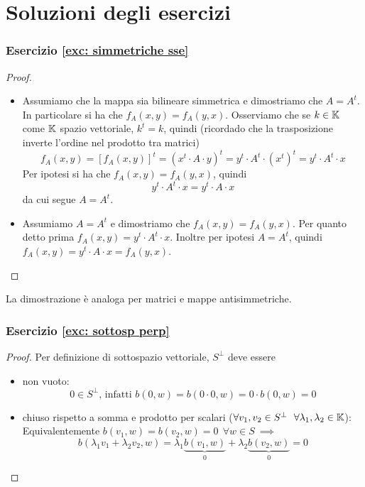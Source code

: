 \documentclass{article}     %
\begin{document}
\newpage
\section{Soluzioni degli esercizi}
\subsubsection*{Esercizio \ref{exc: simmetriche sse}}\label{sol: simmetriche sse}
\begin{proof}~
    \begin{itemize}
        \item [\say{$\Rarr$}] Assumiamo che la mappa sia bilineare simmetrica e dimostriamo che $A=A^t$. In particolare si ha che $f_A(x,y)=f_A(y,x)$. Osserviamo che se $k \in \mathbb{K}$ come $\mathbb{K}$ spazio vettoriale, $k^t=k$, quindi (ricordado che la trasposizione inverte l'ordine nel prodotto tra matrici)
        \[f_A(x,y)=[f_A(x,y)]^t=\left( x^t\cdot A \cdot y \right)^t= y^t\cdot  A^t \cdot \left( x^t \right)^t= y^t\cdot A^t \cdot x \] 
        Per ipotesi si ha che $f_A(x,y)=f_A(y,x)$, quindi 
        \[y^t\cdot A^t \cdot x= y^t\cdot A \cdot x\]
        da cui segue $A=A^t$.
        \item [\say{$\Larr$}] Assumiamo $A=A^t$ e dimostriamo che $f_A(x,y)=f_A(y,x)$. Per quanto detto prima $f_A(x,y)=y^t\cdot A^t\cdot x$. Inoltre per ipotesi $A=A^t$, quindi $f_A(x,y)=y^t\cdot A\cdot x=f_A(y,x)$.
    \end{itemize}
\end{proof}
La dimostrazione è analoga per matrici e mappe antisimmetriche.

\subsubsection*{Esercizio \ref{exc: sottosp perp}}\label{sol: sottosp perp}
\begin{proof}Per definizione di sottospazio vettoriale, $S^\perp$ deve essere
    \begin{itemize}
        \item non vuoto:
        \[0\in S^\perp\text{, infatti }b(0,w)=b(0\cdot 0,w)=0\cdot b(0,w)=0\]
        \item chiuso rispetto a somma e prodotto per scalari ($\forall v_1,v_2\in S^\perp\ \ \forall \lambda_1, \lambda_2\in \mathbb{K}$):\\
        Equivalentemente $b(v_1,w)=b(v_2,w)=0\ \ \forall w\in S\ \implies$
        \[b(\lambda_1v_1+\lambda_2v_2,w)= \lambda_1\underbrace{b(v_1,w)}_0+\lambda_2\underbrace{b(v_2,w)}_0= 0\]
    \end{itemize}
\end{proof}
\end{document}
